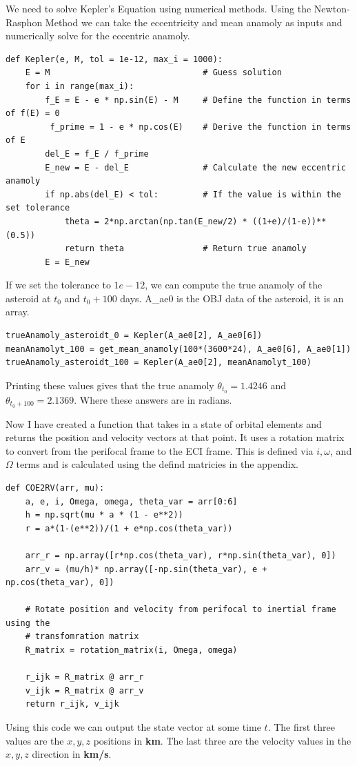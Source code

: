 \documentclass[12pt,twocolumn]{article}  %
\begin{document}
We need to solve Kepler's Equation using numerical methods. Using the Newton-Rasphon Method we can take the eccentricity and mean anamoly as 
inputs and numerically solve for the eccentric anamoly. 

\begin{lstlisting}
def Kepler(e, M, tol = 1e-12, max_i = 1000):
    E = M                               # Guess solution
    for i in range(max_i):
        f_E = E - e * np.sin(E) - M     # Define the function in terms of f(E) = 0
         f_prime = 1 - e * np.cos(E)    # Derive the function in terms of E
        del_E = f_E / f_prime           
        E_new = E - del_E               # Calculate the new eccentric anamoly
        if np.abs(del_E) < tol:         # If the value is within the set tolerance 
            theta = 2*np.arctan(np.tan(E_new/2) * ((1+e)/(1-e))**(0.5))
            return theta                # Return true anamoly
        E = E_new
\end{lstlisting}
\vspace{0.5cm}
If we set the tolerance to $1e-12$, we can compute the true anamoly of the asteroid 
at $t_0$ and $t_0 + 100$ days. A\_ae0 is the OBJ data of the asteroid, it is an array.
\begin{lstlisting}
trueAnamoly_asteroidt_0 = Kepler(A_ae0[2], A_ae0[6])  
meanAnamolyt_100 = get_mean_anamoly(100*(3600*24), A_ae0[6], A_ae0[1])
trueAnamoly_asteroidt_100 = Kepler(A_ae0[2], meanAnamolyt_100)
\end{lstlisting}
Printing these values gives that the true anamoly $\theta_{t_0} = 1.4246$ and $\theta_{t_0 + 100} = 2.1369$. 
Where these answers are in radians.

\vspace{0.5cm}
Now I have created a function that takes in a state of orbital elements and returns 
the position and velocity vectors at that point. It uses a rotation matrix to convert from 
the perifocal frame to the ECI frame. This is defined via $i, \omega$, and $\Omega$ terms and is 
calculated using the defind matricies in the appendix.
\begin{lstlisting}   
def COE2RV(arr, mu):
    a, e, i, Omega, omega, theta_var = arr[0:6]
    h = np.sqrt(mu * a * (1 - e**2))
    r = a*(1-(e**2))/(1 + e*np.cos(theta_var))

    arr_r = np.array([r*np.cos(theta_var), r*np.sin(theta_var), 0])
    arr_v = (mu/h)* np.array([-np.sin(theta_var), e + np.cos(theta_var), 0])

    # Rotate position and velocity from perifocal to inertial frame using the 
    # transfomration matrix
    R_matrix = rotation_matrix(i, Omega, omega)

    r_ijk = R_matrix @ arr_r
    v_ijk = R_matrix @ arr_v
    return r_ijk, v_ijk
\end{lstlisting}
\vspace{0.35cm}
Using this code we can output the state vector at some time $t$. The first three values 
are the $x,y,z$ positions in \textbf{km}. The last three are the velocity values in the $x,y,z$ direction 
in \textbf{km/s}.
\end{document}
